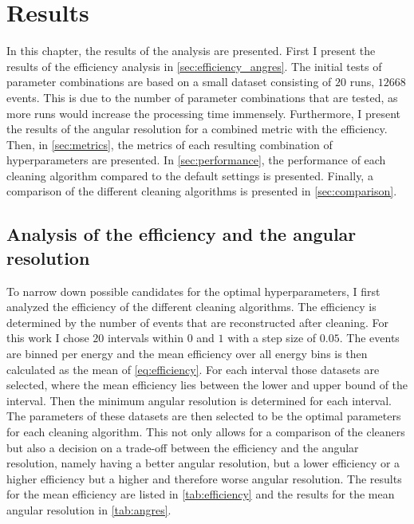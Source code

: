 \chapter{Results}
\label{ch:results}

In this chapter, the results of the analysis are presented. First I present the results of the
efficiency analysis in \autoref{sec:efficiency_angres}. The initial tests of parameter combinations
are based on a small dataset consisting of \(\num{20}\) runs, \ie \(\num{12668}\) events. This is
due to the number of parameter combinations that are tested, as more runs would increase the
processing time immensely. Furthermore, I present the results of the angular resolution for a combined
metric with the efficiency. Then, in \autoref{sec:metrics}, the metrics of each resulting combination
of hyperparameters are presented. In \autoref{sec:performance}, the performance of each cleaning
algorithm compared to the default settings is presented. Finally, a comparison of the different
cleaning algorithms is presented in \autoref{sec:comparison}.


\section{Analysis of the efficiency and the angular resolution}
\label{sec:efficiency_angres}

To narrow down possible candidates for the optimal hyperparameters, I first analyzed the efficiency
of the different cleaning algorithms. The efficiency is determined by the number of events that are
reconstructed after cleaning. For this work I chose \(\num{20}\) intervals within \(\num{0}\) and
\(\num{1}\) with a step size of \(\num{0.05}\). The events are binned per energy and the mean efficiency over all
energy bins is then calculated as the mean of \autoref{eq:efficiency}. For each interval those datasets are selected, where the mean efficiency
lies between the lower and upper bound of the interval. Then the minimum angular resolution is
determined for each interval. The parameters of these datasets are then selected to be the optimal
parameters for each cleaning algorithm. This not only allows for a comparison of the cleaners but also
a decision on a trade-off between the efficiency and the angular resolution, namely having a better
angular resolution, but a lower efficiency or a higher efficiency but a higher and therefore worse
angular resolution. The results for the mean efficiency are listed in \autoref{tab:efficiency} and
the results for the mean angular resolution in \autoref{tab:angres}.

